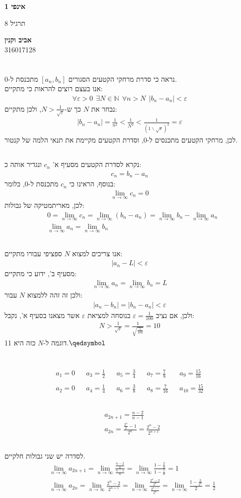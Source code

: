 \documentclass[a4paper, 12pt, leqno]{article}
\newcommand{\sub}[1]{\subsection{\underline{#1}}}
\newcommand{\N}{\ensuremath{\mathbb{N}}}
\newcommand{\eq}[1]{\begin{align*}#1\end{align*}}
\newcommand{\limn}{\lim_{n\to\infty}}
\renewcommand{\qed}{\hfill\(\qedsymbol\)}
\begin{document}
\begin{titlepage}
    \begin{center}
        \vspace*{4cm}
    
        {\fontsize{32pt}{32pt}\selectfont \textbf{אינפי 1}}
        
        \vspace{0.4cm}
        
        {\LARGE
        תרגיל 8}
    
        \vfill
            
        {
            \Large\textbf{אביב וקנין}
            \\
            316017128
        }
    \end{center}
\end{titlepage}

\section{}
\sub{}
נראה כי סדרת מרחקי הקטעים הסגורים $[a_n,b_n]$ מתכנסת ל-0.\\
אנו בעצם רוצים להראות כי מתקיים:
\eq{
    \forall\varepsilon>0~~\exists{N}\in\N~~\forall{n}>N~~|b_n-a_n|<\varepsilon
}
נבחר את $N$ כך ש-$N>\frac{1}{\sqrt{\varepsilon}}$, ולכן מתקיים:
\eq{
    |b_n-a_n|=\frac{1}{n^2}<\frac{1}{N^2}<\frac{1}{(1\backslash\sqrt{\varepsilon})^2}=\varepsilon
}
לכן, מרחקי הקטעים מתכנסים ל-$0$, וסדרת הקטעים מקיימת את תנאי הלמה של קנטור.
\sub{}
נקרא לסדרת הקטעים מסעיף א' $c_n$ ונגדיר אותה כ:
\eq{
    c_n=b_n-a_n
}
בנוסף, הראינו כי $c_n$ מתכנסת ל-0, כלומר:
\eq{
    \limn{c_n}=0
}
לכן, מאריתמטיקה של גבולות:
\eq{
    &0=\limn{c_n}=\limn(b_n-a_n)=\limn{b_n}-\limn{a_n}\\
    &\limn{a_n}=\limn{b_n}
}
\sub{}
אנו צריכים למצוא $N$ ספציפי עבורו מתקיים:
\eq{
    |a_n-L|<\varepsilon
}
מסעיף ב', ידוע כי מתקיים:
\eq{
    \limn{a_n}=\limn{b_n}=L
}
ולכן זה זהה ללמצוא $N$ עבור:
\eq{
    |a_n-b_n|=|b_n-a_n|<\varepsilon
}
ולכן, אם נציב $\varepsilon=\frac{1}{100}$ בנוסחה למציאת $\varepsilon$ אשר מצאנו בסעיף א', נקבל:
\eq{
    N>\frac{1}{\sqrt{\varepsilon}}=\frac{1}{\sqrt{\frac{1}{100}}}=10
}
דוגמה ל-$N$ כזה היא 11.\qed

\section{}
\sub{}
\eq{
    a_1=0 && a_3=\frac{1}{2} && a_5 = \frac{3}{4} && a_7 = \frac{7}{8} && a_9 = \frac{15}{16}\\\\
    a_2=0 && a_4=\frac{1}{4} && a_6 = \frac{3}{8} && a_8 = \frac{7}{16} && a_{10} = \frac{15}{32}
}
\sub{}
\eq{
    &a_{2n+1}=\frac{n-2}{n-1}\\
    &a_{2n}=\frac{\frac{2^n}{2}-1}{2^n}=\frac{2^n-2}{2^{n+1}}
}
\sub{}
לסדרה יש שני גבולות חלקיים.
\eq{
    &\limn{a_{2n+1}}=\limn{\frac{\frac{n-2}{n}}{\frac{n-1}{n}}}=\limn{\frac{1-\frac{2}{n}}{1-\frac{1}{n}}}=1\\
    &\limn{a_{2n}}=\limn{\frac{2^n-2}{2^{n+1}}}=\limn{\frac{\frac{2^n-2}{2^n}}{\frac{2^{n+1}}{2^n}}}=\limn{\frac{1-\frac{2}{2^n}}{2}}=\frac{1}{2}
}
\end{document}
